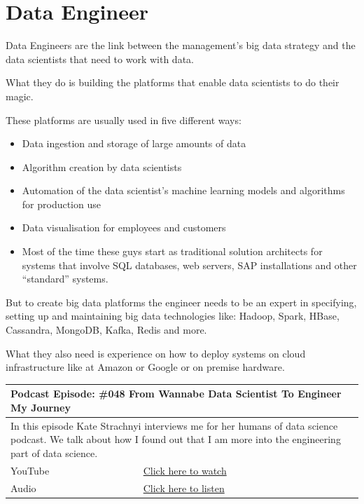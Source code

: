 \documentclass[12pt, numbers=noenddot]{scrreprt} %
\begin{document}
\section{Data Engineer}
Data Engineers are the link between the management’s big data strategy and the data scientists that need to work with data.

What they do is building the platforms that enable data scientists to do their magic.

These platforms are usually used in five different ways:

\begin{itemize}
\item  Data ingestion and storage of large amounts of data
\item Algorithm creation by data scientists
\item Automation of the data scientist’s machine learning models and algorithms for production use
\item Data visualisation for employees and customers
\item  Most of the time these guys start as traditional solution architects for systems that involve SQL databases, web servers, SAP installations and other “standard” systems.
\end{itemize}

But to create big data platforms the engineer needs to be an expert in specifying, setting up and maintaining big data technologies like: Hadoop, Spark, HBase, Cassandra, MongoDB, Kafka, Redis and more.

What they also need is experience on how to deploy systems on cloud infrastructure like at Amazon or Google or on premise hardware.

\begin{table}[h]
\begin{tabular}{ll}
\hline
\multicolumn{2}{l}{\textbf{Podcast Episode:} \#048 From Wannabe Data Scientist To Engineer My Journey} \\ \hline
\multicolumn{2}{p{15cm}}{In this episode Kate Strachnyi interviews me for her humans of data science podcast. We talk about how I found out that I am more into the engineering part of data science.}         \\ \hline
\multicolumn{1}{l|}{YouTube}   & \href{https://youtu.be/pIZkTuN5AMM}{Click here to watch}   \\ 
\multicolumn{1}{l|}{Audio}     & \href{https://anchor.fm/andreaskayy/episodes/048-From-Wannabe-Data-Scientist-To-Engineer-My-Journey-e45i2o}{Click here to listen}   \\ \hline
\end{tabular}
\end{table}
\end{document}
